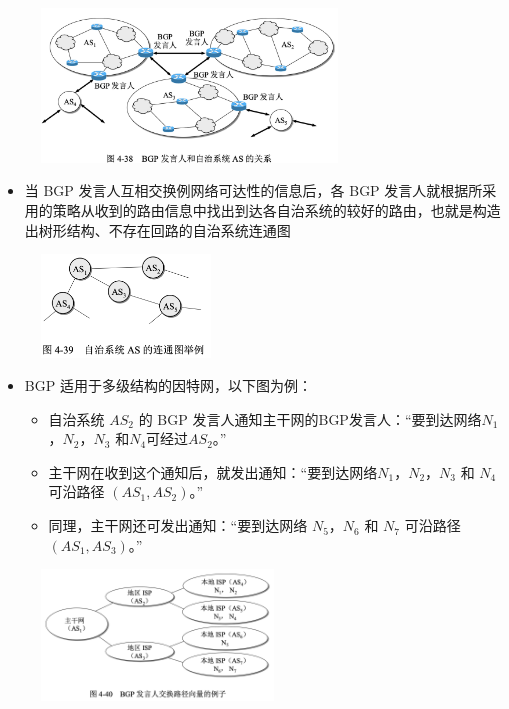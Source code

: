 \documentclass[cs4size,a4paper,10pt]{ctexart}
\begin{document}
	\begin{figure}[H]
		\centering
		\includegraphics[width=0.7\textwidth]{img/4.38}
	\end{figure}

	\begin{itemize}
		\item 当 BGP 发言人互相交换例网络可达性的信息后，各 BGP 发言人就根据所采用的策略从收到的路由信息中找出到达各自治系统的较好的路由，也就是构造出树形结构、不存在回路的自治系统连通图
	\end{itemize}

	\begin{figure}[H]
		\centering
		\includegraphics[width=0.4\textwidth]{img/4.39}
	\end{figure}

	\begin{itemize}
		\item BGP 适用于多级结构的因特网，以下图为例：
		\begin{itemize}
			\item 自治系统 $AS_2$ 的 BGP 发言人通知主干网的BGP发言人：“要到达网络$N_1$，$N_2$，$N_3$ 和$N_4$可经过$AS_2$。”
			\item 主干网在收到这个通知后，就发出通知：“要到达网络$N_1$，$N_2$，$N_3$ 和 $N_4$ 可沿路径 $(AS_1,AS_2)$。”
			\item 同理，主干网还可发出通知：“要到达网络 $N_5$，$N_6$ 和 $N_7$ 可沿路径 $(AS_1,AS_3)$。”
		\end{itemize}
	\end{itemize}

	\begin{figure}[H]
		\centering
		\includegraphics[width=0.55\textwidth]{img/4.40}
	\end{figure}
\end{document}
